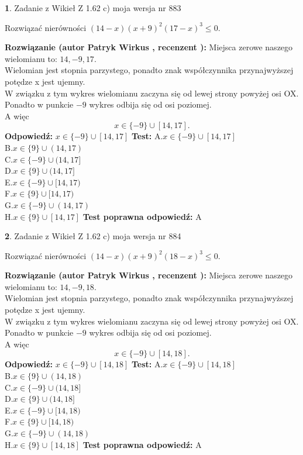 \documentclass[12pt, a4paper]{article}
\theoremstyle{definition} %
\newtheorem{zad}{}
\newcommand{\zadStart}[1]{\begin{zad}#1\newline}
\newcommand{\zadStop}{\end{zad}}
\newcommand{\rozwStart}[2]{\noindent \textbf{Rozwiązanie (autor #1 , recenzent #2): }\newline}
\newcommand{\rozwStop}{\newline}
\newcommand{\odpStart}{\noindent \textbf{Odpowiedź:}\newline}
\newcommand{\odpStop}{\newline}
\newcommand{\testStart}{\noindent \textbf{Test:}\newline}
\newcommand{\testStop}{\newline}
\newcommand{\kluczStart}{\noindent \textbf{Test poprawna odpowiedź:}\newline}
\newcommand{\kluczStop}{\newline}
\begin{document}
\zadStart{Zadanie z Wikieł Z 1.62 c) moja wersja nr 883}

Rozwiązać nierówności $(14-x)(x+9)^{2}(17-x)^{3}\le0$.
\zadStop
\rozwStart{Patryk Wirkus}{}
Miejsca zerowe naszego wielomianu to: $14, -9, 17$.\\
Wielomian jest stopnia parzystego, ponadto znak współczynnika przy\linebreak najwyższej potędze x jest ujemny.\\ W związku z tym wykres wielomianu zaczyna się od lewej strony powyżej osi OX.\\
Ponadto w punkcie $-9$ wykres odbija się od osi poziomej.\\
A więc $$x \in \{-9\} \cup [14,17].$$
\rozwStop
\odpStart
$x \in \{-9\} \cup [14,17]$
\odpStop
\testStart
A.$x \in \{-9\} \cup [14,17]$\\
B.$x \in \{9\} \cup (14,17)$\\
C.$x \in \{-9\} \cup (14,17]$\\
D.$x \in \{9\} \cup (14,17]$\\
E.$x \in \{-9\} \cup [14,17)$\\
F.$x \in \{9\} \cup [14,17)$\\
G.$x \in \{-9\} \cup (14,17)$\\
H.$x \in \{9\} \cup [14,17]$
\testStop
\kluczStart
A
\kluczStop



\zadStart{Zadanie z Wikieł Z 1.62 c) moja wersja nr 884}

Rozwiązać nierówności $(14-x)(x+9)^{2}(18-x)^{3}\le0$.
\zadStop
\rozwStart{Patryk Wirkus}{}
Miejsca zerowe naszego wielomianu to: $14, -9, 18$.\\
Wielomian jest stopnia parzystego, ponadto znak współczynnika przy\linebreak najwyższej potędze x jest ujemny.\\ W związku z tym wykres wielomianu zaczyna się od lewej strony powyżej osi OX.\\
Ponadto w punkcie $-9$ wykres odbija się od osi poziomej.\\
A więc $$x \in \{-9\} \cup [14,18].$$
\rozwStop
\odpStart
$x \in \{-9\} \cup [14,18]$
\odpStop
\testStart
A.$x \in \{-9\} \cup [14,18]$\\
B.$x \in \{9\} \cup (14,18)$\\
C.$x \in \{-9\} \cup (14,18]$\\
D.$x \in \{9\} \cup (14,18]$\\
E.$x \in \{-9\} \cup [14,18)$\\
F.$x \in \{9\} \cup [14,18)$\\
G.$x \in \{-9\} \cup (14,18)$\\
H.$x \in \{9\} \cup [14,18]$
\testStop
\kluczStart
A
\kluczStop
\end{document}

